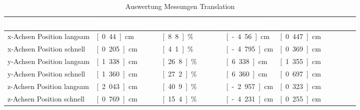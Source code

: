 \begin{table}[htbp]
     \centering
     \caption{Auswertung Messungen Translation}
     \label{tab:auswertung_tran}
     \begin{tabularx}{\textwidth}{|X|l|l|l|l|} 
		\hline
		\rowcolor{bfhblue}
		\textcolor{white}{Messung} & \textcolor{white}{Absoluter Fehler} & \textcolor{white}{Relativer Fehler} & \textcolor{white}{Mittelwert}  & \textcolor{white}{Standardabweichung}\\
		\hline
		x-Achsen Position langsam & \unit[0.44]{cm} & \unit[8.8]{\%} & \unit[-4.56]{cm} & \unit[0.447]{cm}\\
		\hline
		x-Achsen Position schnell & \unit[0.205]{cm} & \unit[4.1]{\%} & \unit[-4.795]{cm} & \unit[0.369]{cm} \\
		\hline
		y-Achsen Position langsam & \unit[1.338]{cm} & \unit[26.8]{\%} & \unit[6.338]{cm} & \unit[1.355]{cm}\\
		\hline
		y-Achsen Position schnell & \unit[1.360]{cm} & \unit[27.2]{\%} & \unit[6.360]{cm} & \unit[0.697]{cm} \\
		\hline
		z-Achsen Position langsam & \unit[2.043]{cm} & \unit[40.9]{\%} & \unit[-2.957]{cm} & \unit[0.323]{cm} \\
		\hline
		z-Achsen Position schnell & \unit[0.769]{cm} & \unit[15.4]{\%} & \unit[-4.231]{cm} & \unit[0.255]{cm}\\
		\hline
     \end{tabularx}  
\end{table}